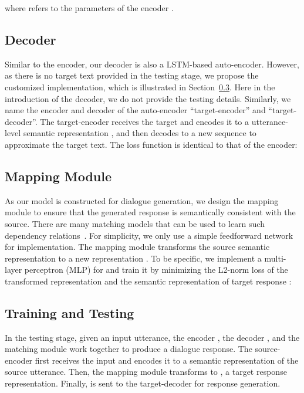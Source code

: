 \documentclass[11pt,a4paper]{article}
\begin{document}
\begin{CJK}{UTF8}{song}
where  refers to the parameters of the encoder .




\subsection{Decoder}\label{decoder}
Similar to the encoder, our decoder  is also a LSTM-based auto-encoder. However, as there is no target text provided in the testing stage, we propose the customized implementation, which is illustrated in Section~\ref{training}. Here in the introduction of the decoder, we do not provide the testing details. Similarly, we name the encoder and decoder of the auto-encoder ``target-encoder'' and ``target-decoder''. The target-encoder receives the target  and encodes it to a utterance-level semantic representation , and then decodes  to a new sequence to approximate the target text. The loss function is identical to that of the encoder:



\subsection{Mapping Module}\label{mapping}
As our model is constructed for dialogue generation, we design the mapping module to ensure that the generated response is semantically consistent with the source. There are many matching models that can be used to learn such dependency relations~\cite{DBLP:conf/nips/HuLLC14,DBLP:conf/cikm/GuoFAC16,DBLP:conf/aaai/PangLGXWC16,chendeli18}. For simplicity, we only use a simple feedforward network for implementation.  The mapping module  transforms the source semantic representation  to a new representation . To be specific, we implement a multi-layer perceptron (MLP)  for  and train it by minimizing the L2-norm loss  of the transformed representation  and the semantic representation of target response :














\subsection{Training and Testing}
\label{training}
In the testing stage, given an input utterance, the encoder , the decoder , and the matching module  work together to produce a dialogue response.
The source-encoder first receives the input  and encodes it to a semantic representation  of the source utterance. Then, the mapping module transforms  to , a target response representation. Finally,  is sent to the target-decoder for response generation.


\end{CJK}
\end{document}
